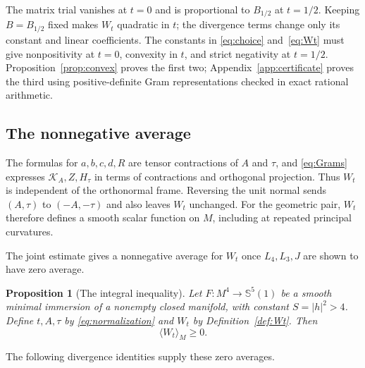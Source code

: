 \documentclass[11pt,a4paper]{amsart}
\numberwithin{equation}{section}
\newtheorem{proposition}[theorem]{Proposition}
\theoremstyle{definition}
\theoremstyle{remark}
\newcommand{\Sph}{\mathbb S}
\newcommand{\K}{\mathcal K}
\newcommand{\av}[1]{\langle #1\rangle_M}
\begin{document}
The matrix trial vanishes at $t=0$ and is proportional to $B_{1/2}$
at $t=1/2$. Keeping $B=B_{1/2}$ fixed makes $W_t$ quadratic in $t$;
the divergence terms change only its constant and linear coefficients.
The constants in \eqref{eq:choice} and~\eqref{eq:Wt} must give
nonpositivity at $t=0$, convexity in $t$, and strict negativity at $t=1/2$.
Proposition~\ref{prop:convex} proves the first two; Appendix~\ref{app:certificate}
proves the third using positive-definite Gram representations checked
in exact rational arithmetic.

\subsection{The nonnegative average}
The formulas for $a,b,c,d,R$ are tensor contractions of $A$ and
$\tau$, and \eqref{eq:Grams} expresses $\K_A,Z,H_\tau$ in terms
of contractions and orthogonal projection. Thus $W_t$ is independent
of the orthonormal frame. Reversing the unit normal sends
$(A,\tau)$ to $(-A,-\tau)$ and also leaves $W_t$ unchanged.
For the geometric pair, $W_t$ therefore defines a smooth scalar
function on $M$, including at repeated principal curvatures.

The joint estimate gives a nonnegative average for $W_t$ once
$L_4,L_3,J$ are shown to have zero average.

\begin{proposition}[The integral inequality]\label{prop:meanconvex}
Let $F:M^4\to\Sph^5(1)$ be a smooth minimal immersion of a nonempty
closed manifold, with constant $S=|h|^2>4$. Define $t,A,\tau$ by
\eqref{eq:normalization} and $W_t$ by Definition~\ref{def:Wt}.
Then
\begin{equation}\label{eq:Wmean}
 \av{W_t}\ge0.
\end{equation}
\end{proposition}

The following divergence identities supply these zero averages.
\end{document}
